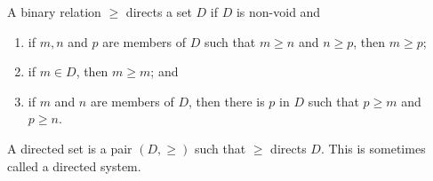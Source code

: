 A binary relation $\geq$ directs a set $D$ if $D$ is non-void and

\begin{enumerate}
\item[(a)] if $m, n$ and $p$ are members of $D$ such that $m \geq n$ and $n \geq p$, then $m \geq p$;
\item[(b)] if $m \in D$, then $m \geq m$; and
\item[(c)] if $m$ and $n$ are members of $D$, then there is $p$ in $D$ such that $p \geq m$ and $p \geq n$.
\end{enumerate}

A directed set is a pair $(D, \geq)$ such that $\geq$ directs $D$. This is sometimes called a directed system.
